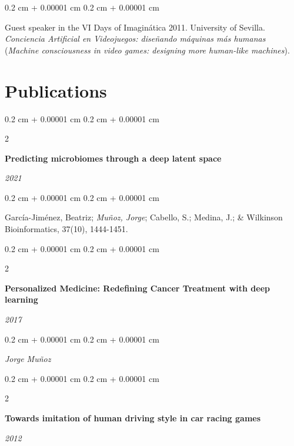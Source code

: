 \documentclass[10pt, letterpaper]{article}
\newenvironment{onecolentry}{
	\begin{adjustwidth}{
		0.2 cm + 0.00001 cm
	}{
		0.2 cm + 0.00001 cm
	}
	}{
	\end{adjustwidth}
} %
\newenvironment{twocolentry}[2][]{
	\onecolentry
	\def\secondColumn{#2}
	\setcolumnwidth{\fill, 5.5 cm}
	\begin{paracol}{2}
	}{
		\switchcolumn \raggedleft \secondColumn
	\end{paracol}
	\endonecolentry
} %
\let\hrefWithoutArrow\href
\renewcommand{\href}[2]{\hrefWithoutArrow{#1}{\ifthenelse{\equal{#2}{}}{ }{#2 }\raisebox{.15ex}{\footnotesize \faExternalLink*}}}
\begin{document}
	\vspace{0.10 cm}
	\begin{onecolentry}
		Guest speaker in the VI Days of Imaginática 2011. University of Sevilla. \textit{Conciencia Artificial en Videojuegos: diseñando máquinas más humanas} (\textit{Machine consciousness in video games: designing more human-like machines}).
	\end{onecolentry}


	\section{Publications}

	\begin{twocolentry}{
		\textit{2021}}
		\textbf{Predicting microbiomes through a deep latent space}
	\end{twocolentry}

	\vspace{0.10 cm}
	\begin{onecolentry}
		García-Jiménez, Beatriz; \textit{Muñoz, Jorge}; Cabello, S.; Medina, J.; \& Wilkinson\\
		Bioinformatics, 37(10), 1444-1451.\\
		\href{https://academic.oup.com/bioinformatics/article-pdf/37/10/1444/38663810/btaa971.pdf}{[PDF]}
	\end{onecolentry}

	\vspace{0.2 cm}

	\begin{twocolentry}{
		\textit{2017}}
		\textbf{Personalized Medicine: Redefining Cancer Treatment with deep learning}
	\end{twocolentry}

	\vspace{0.10 cm}
	\begin{onecolentry}
		\textit{Jorge Muñoz}\\
		\href{https://jorgemf.github.io/text\%20classification/2017/10/14/personalized-medicine-redefining-cancer-treatment-by-deep-learning.html}{[HTML]} \href{https://github.com/jorgemf/kaggle_redefining_cancer_treatment}{[GitHub]} \href{https://medium.com/@jorgemf/personalized-medicine-redefining-cancer-treatment-with-deep-learning-f6c64a366fff}{[Medium]}
	\end{onecolentry}

	\vspace{0.2 cm}

	\begin{twocolentry}{
		\textit{2012}}
		\textbf{Towards imitation of human driving style in car racing games}
	\end{twocolentry}
\end{document}

